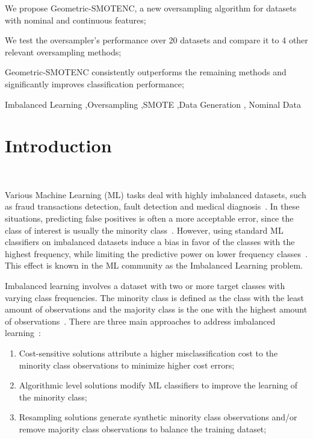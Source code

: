 \documentclass[preprint,12pt]{elsarticle}
\begin{document}
{\begin{frontmatter}
\begin{highlights}
    \item We propose Geometric-SMOTENC, a new oversampling algorithm for
        datasets with nominal and continuous features;
    \item We test the oversampler's performance over 20 datasets and compare
        it to 4 other relevant oversampling methods;
    \item Geometric-SMOTENC consistently outperforms the remaining methods and
        significantly improves classification performance;
\end{highlights}

\begin{keyword}
Imbalanced Learning \sep Oversampling \sep SMOTE \sep Data Generation \sep
Nominal Data
\end{keyword}

\end{frontmatter}

\linenumbers%

\section{Introduction}~\label{sec:introduction}

Various Machine Learning (ML) tasks deal with highly imbalanced datasets, such
as fraud transactions detection, fault detection and medical
diagnosis~\cite{tyagi2020sampling}. In these situations, predicting false
positives is often a more acceptable error, since the class of interest is
usually the minority class~\cite{vuttipittayamongkol2021class}. However, using
standard ML classifiers on imbalanced datasets induce a bias in favor of the
classes with the highest frequency, while limiting the predictive power on
lower frequency classes~\cite{lopez2013insight, das2018handling}. This effect
is known in the ML community as the Imbalanced Learning problem.

Imbalanced learning involves a dataset with two or more target classes with
varying class frequencies. The minority class is defined as the class with the
least amount of observations and the majority class is the one with the
highest amount of observations~\cite{kaur2019systematic}. There are three main
approaches to address imbalanced learning~\cite{fernandez2013analysing}: 

\begin{enumerate}
    \item Cost-sensitive solutions attribute a higher misclassification cost
        to the minority class observations to minimize higher cost errors;
    \item Algorithmic level solutions modify ML classifiers to improve the
        learning of the minority class;
    \item Resampling solutions generate synthetic minority class observations
        and/or remove majority class observations to balance the training
        dataset;
\end{enumerate}

}
\end{document}
